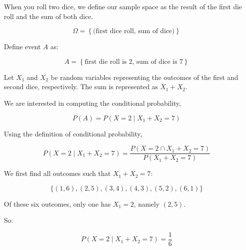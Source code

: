 \documentclass{article}
\begin{document}
When you roll two dice, we define our sample space as the result of the first die roll and the sum of both dice.

\[
\Omega = \left\{ \text{(first dice roll, sum of dice)} \right\}
\]

Define event \( A \) as:

\[
A = \left\{ \text{first die roll is 2, sum of dice is 7} \right\}
\]

Let \( X_1 \) and \( X_2 \) be random variables representing the outcomes of the first and second dice, respectively.  
The sum is represented as \( X_1 + X_2 \).

We are interested in computing the conditional probability,

\[
P(A) = P(X = 2 \mid X_1 + X_2 = 7)
\]

Using the definition of conditional probability,

\[
P(X = 2 \mid X_1 + X_2 = 7) = \frac{P(X = 2 \cap X_1 + X_2 = 7)}{P(X_1 + X_2 = 7)}
\]

We first find all outcomes such that \( X_1 + X_2 = 7 \):

\[
\{ (1,6), (2,5), (3,4), (4,3), (5,2), (6,1) \}
\]

Of these six outcomes, only one has \(X_1 = 2 \), namely \( (2,5) \).

So:

\[
P(X = 2 \mid X_1 + X_2 = 7) = \frac{1}{6}
\]
\end{document}
